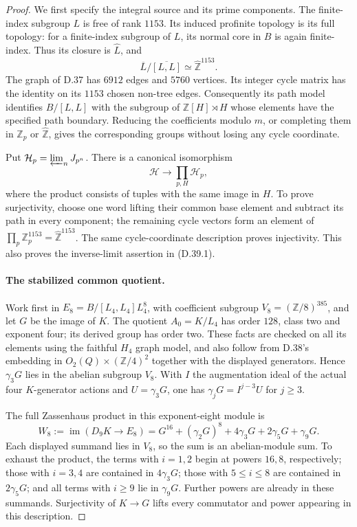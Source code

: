 \begin{proof}
We first specify the integral source and its prime components.
The finite-index subgroup $L$ is free of rank $1153$.
Its induced profinite topology is its full topology: for a
finite-index subgroup of $L$, its normal core in $B$ is again
finite-index. Thus its closure is $\widehat L$, and
\[
 \overline L/\overline{[L,L]}\simeq\widehat{\mathbb Z}^{1153}.
                                                               \tag{D.39.8}
\]
The graph of D.37 has $6912$ edges and $5760$ vertices. Its
integer cycle matrix has the identity on its $1153$ chosen
non-tree edges. Consequently its path model identifies
$B/[L,L]$ with the subgroup of $\mathbb Z[H]\rtimes H$
whose elements have the specified path boundary. Reducing
the coefficients modulo $m$, or completing them in
$\mathbb Z_p$ or $\widehat{\mathbb Z}$, gives the corresponding
groups without losing any cycle coordinate.

Put $\mathcal H_p=\varprojlim_nJ_{p^n}$. There is a canonical
isomorphism
\[
 \mathcal H\longrightarrow\prod_{p,H}\mathcal H_p,          \tag{D.39.9}
\]
where the product consists of tuples with the same image in
$H$. To prove surjectivity, choose one word lifting their
common base element and subtract its path in every component;
the remaining cycle vectors form an element of
$\prod_p\mathbb Z_p^{1153}=\widehat{\mathbb Z}^{1153}$.
The same cycle-coordinate description proves injectivity.
This also proves the inverse-limit assertion in (D.39.1).

\paragraph{The stabilized common quotient.}
Work first in
$E_8=B/[L_4,L_4]L_4^8$, with coefficient subgroup
$V_8=(\mathbb Z/8)^{385}$, and let $G$ be the image of $K$.
The quotient $A_0=K/L_4$ has order $128$, class two and
exponent four; its derived group has order two. These facts
are checked on all its elements using the faithful
$H_4$ graph model, and also follow from D.38's embedding
in $O_2(Q)\times(\mathbb Z/4)^2$ together with the displayed
generators. Hence $\gamma_3G$ lies in the abelian subgroup
$V_8$. With $I$ the augmentation ideal of the actual four
$K$-generator actions and $U=\gamma_3G$, one has
$\gamma_jG=I^{j-3}U$ for $j\ge3$.

The full Zassenhaus product in this exponent-eight module is
\[
 W_8:=\operatorname{im}(D_9K\to E_8)
   =G^{16}+(\gamma_2G)^8+4\gamma_3G
        +2\gamma_5G+\gamma_9G.                            \tag{D.39.10}
\]
Each displayed summand lies in $V_8$, so the sum is an
abelian-module sum. To exhaust the product, the terms with
$i=1,2$ begin at powers $16,8$, respectively; those with
$i=3,4$ are contained in $4\gamma_3G$; those with
$5\le i\le8$ are contained in $2\gamma_5G$; and all terms
with $i\ge9$ lie in $\gamma_9G$. Further powers are already
in these summands. Surjectivity of $K\to G$ lifts every
commutator and power appearing in this description.


\end{proof}
